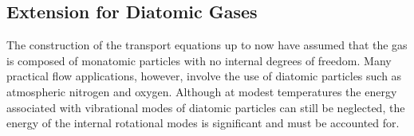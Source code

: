 \documentclass[titlepage,11pt,letterpaper]{article}
\begin{document}


\subsection{Extension for Diatomic Gases}
The construction of the transport equations up to now have assumed that the gas is 
composed of monatomic particles with no internal degrees of freedom. Many practical flow 
applications, however, involve the use of diatomic particles such as atmospheric 
nitrogen and oxygen.  Although at modest temperatures the energy associated with 
vibrational modes of diatomic particles can still be neglected, the energy of the internal 
rotational modes is significant and must be accounted for.
\end{document}
